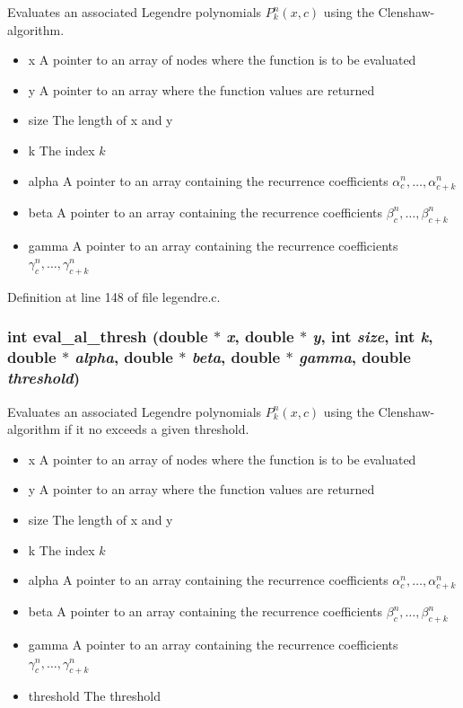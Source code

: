 Evaluates an associated Legendre polynomials $P_k^n(x,c)$ using the Clenshaw-algorithm. 

\begin{itemize}
\item x A pointer to an array of nodes where the function is to be evaluated \item y A pointer to an array where the function values are returned \item size The length of x and y \item k The index $k$ \item alpha A pointer to an array containing the recurrence coefficients $\alpha_c^n,\ldots,\alpha_{c+k}^n$ \item beta A pointer to an array containing the recurrence coefficients $\beta_c^n,\ldots,\beta_{c+k}^n$ \item gamma A pointer to an array containing the recurrence coefficients $\gamma_c^n,\ldots,\gamma_{c+k}^n$ \end{itemize}


Definition at line 148 of file legendre.c.\hypertarget{group__nfsft_ga22}{
\subsubsection[eval\_\-al\_\-thresh]{\setlength{\rightskip}{0pt plus 5cm}int eval\_\-al\_\-thresh (double $\ast$ {\em x}, double $\ast$ {\em y}, int {\em size}, int {\em k}, double $\ast$ {\em alpha}, double $\ast$ {\em beta}, double $\ast$ {\em gamma}, double {\em threshold})}}
\label{group__nfsft_ga22}


Evaluates an associated Legendre polynomials $P_k^n(x,c)$ using the Clenshaw-algorithm if it no exceeds a given threshold. 

\begin{itemize}
\item x A pointer to an array of nodes where the function is to be evaluated \item y A pointer to an array where the function values are returned \item size The length of x and y \item k The index $k$ \item alpha A pointer to an array containing the recurrence coefficients $\alpha_c^n,\ldots,\alpha_{c+k}^n$ \item beta A pointer to an array containing the recurrence coefficients $\beta_c^n,\ldots,\beta_{c+k}^n$ \item gamma A pointer to an array containing the recurrence coefficients $\gamma_c^n,\ldots,\gamma_{c+k}^n$ \item threshold The threshold \end{itemize}


